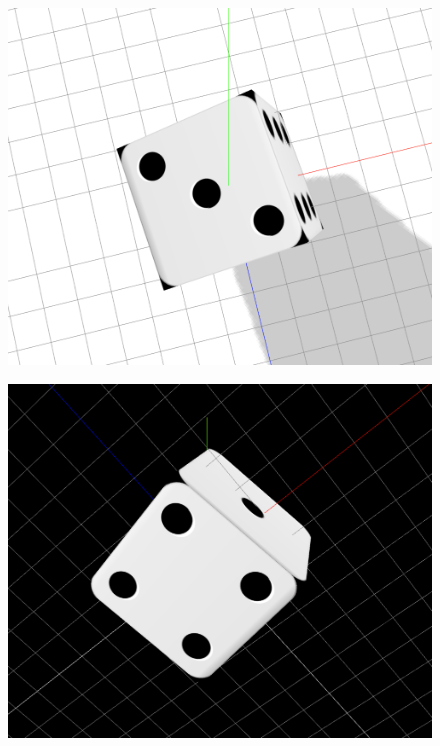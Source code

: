\documentclass[12pt]{article}
\begin{document}
\begin{figure}[H]
  \centering
  \begin{minipage}{.33\textwidth}
    \centering
    \includegraphics[width=.9\linewidth]{23.png}
    \label{fig:test5}
  \end{minipage}%
  \begin{minipage}{.33\textwidth}
    \centering
    \includegraphics[width=.9\linewidth]{24.png}
    \label{fig:test4}
  \end{minipage}
  \begin{minipage}{.33\textwidth}
    \centering

\end{minipage}
\end{figure}
\end{document}
